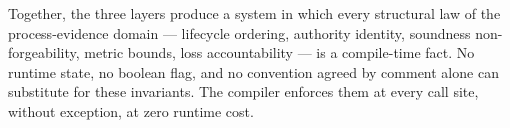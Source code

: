 Together, the three layers produce a system in which every structural law of
the process-evidence domain --- lifecycle ordering, authority identity,
soundness non-forgeability, metric bounds, loss accountability --- is a
compile-time fact. No runtime state, no boolean flag, and no convention
agreed by comment alone can substitute for these invariants. The compiler
enforces them at every call site, without exception, at zero runtime cost.
